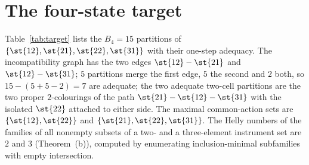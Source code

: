 \section{The four-state target}\label{si:target}

Table~\ref{tab:target} lists the $B_4=15$ partitions of $\{\st{12},\st{21},\st{22},\st{31}\}$ with their one-step adequacy. The incompatibility graph has the two edges $\st{12}-\st{21}$ and $\st{12}-\st{31}$; $5$ partitions merge the first edge, $5$ the second and $2$ both, so $15-(5+5-2)=7$ are adequate; the two adequate two-cell partitions are the two proper $2$-colourings of the path $\st{21}-\st{12}-\st{31}$ with the isolated $\st{22}$ attached to either side. The maximal common-action sets are $\{\st{12},\st{22}\}$ and $\{\st{21},\st{22},\st{31}\}$. The Helly numbers of the families of all nonempty subsets of a two- and a three-element instrument set are $2$ and $3$ (Theorem~(b)), computed by enumerating inclusion-minimal subfamilies with empty intersection.


